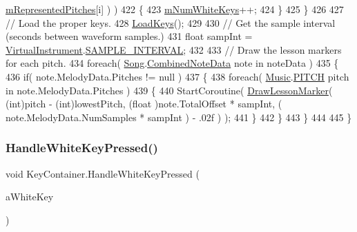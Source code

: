 \begin{DoxyCode}
      \hyperlink{group___key_contain_priv_var_ga103945a6efe3469191e5253d13fec5be}{mRepresentedPitches}[i] ) )
422             \{
423                 \hyperlink{group___key_contain_priv_var_ga7a5547a1fe5c40eac487fe6c826c8f9c}{mNumWhiteKeys}++;
424             \}
425         \}
426 
427         \textcolor{comment}{// Load the proper keys.}
428         \hyperlink{group___key_contain_priv_func_ga65f79700f265d2223681ac95981ab4a3}{LoadKeys}();
429 
430         \textcolor{comment}{// Get the sample interval (seconds between waveform samples.)}
431         \textcolor{keywordtype}{float} sampInt = \hyperlink{class_virtual_instrument}{VirtualInstrument}.\hyperlink{group___v_i_base_const_ga69a037919b64e1e3e0f2b949b2b6af2c}{SAMPLE\_INTERVAL};
432 
433         \textcolor{comment}{// Draw the lesson markers for each pitch.}
434         \textcolor{keywordflow}{foreach}( \hyperlink{class_song}{Song}.\hyperlink{group___song_structs_struct_song_1_1_combined_note_data}{CombinedNoteData} note in noteData )
435         \{
436             \textcolor{keywordflow}{if}( note.MelodyData.Pitches != null )
437             \{
438                 \textcolor{keywordflow}{foreach}( \hyperlink{class_music}{Music}.\hyperlink{group___music_enums_ga508f69b199ea518f935486c990edac1d}{PITCH} pitch in note.MelodyData.Pitches )
439                 \{
440                     StartCoroutine( \hyperlink{group___key_contain_handlers_gac6b82feca83eaf5e3ce6901088bc552c}{DrawLessonMarker}( (\textcolor{keywordtype}{int})pitch - (\textcolor{keywordtype}{int})lowestPitch, (\textcolor{keywordtype}{float}
      )note.TotalOffset * sampInt, ( note.MelodyData.NumSamples * sampInt ) - .02f ) );
441                 \}
442             \}
443         \}
444 
445     \}
\end{DoxyCode}
\mbox{\label{group___key_contain_handlers_ga4e2c5e8be389a7514429910e7d61f028}} 
\subsubsection{\texorpdfstring{Handle\+White\+Key\+Pressed()}{HandleWhiteKeyPressed()}}
{\footnotesize\ttfamily void Key\+Container.\+Handle\+White\+Key\+Pressed (\begin{DoxyParamCaption}\item[{\hyperlink{class_white_key}{White\+Key}}]{a\+White\+Key }\end{DoxyParamCaption})\hspace{0.3cm}{\ttfamily [private]}}



